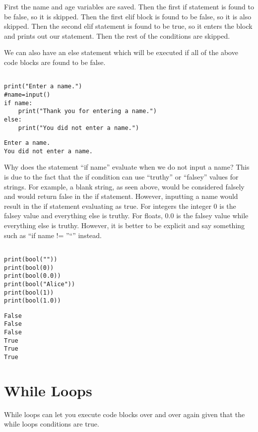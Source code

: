 \documentclass[11pt]{article}
\begin{document}
First the name and age variables are saved. Then the first if statement is found to be false, so it is skipped. Then the first elif block is found to be false, so it is also skipped. Then the second elif statement is found to be true, so it enters the block and prints out our statement. Then the rest of the conditions are skipped.

We can also have an else statement which will be executed if all of the above code blocks are found to be false.


\begin{verbatim}

print("Enter a name.")
#name=input()
if name:
    print("Thank you for entering a name.")
else:
    print("You did not enter a name.")
\end{verbatim}

\begin{verbatim}
Enter a name.
You did not enter a name.
\end{verbatim}


Why does the statement ``if name'' evaluate when we do not input a name? This is due to the fact that the if condition can use ``truthy'' or ``falsey'' values for strings. For example, a blank string, as seen above, would be considered falsely and would return false in the if statement. However, inputting a name would result in the if statement evaluating as true. For integers the integer 0 is the falsey value and everything else is truthy. For floats, 0.0 is the falsey value while everything else is truthy. However, it is better to be explicit and say something such as ``if name != ''``'' instead.


\begin{verbatim}

print(bool(""))
print(bool(0))
print(bool(0.0))
print(bool("Alice"))
print(bool(1))
print(bool(1.0))

\end{verbatim}

\begin{verbatim}
False
False
False
True
True
True
\end{verbatim}

\section{While Loops}
\label{sec:org94a06e0}

While loops can let you execute code blocks over and over again given that the while loops conditions are true.
\end{document}
